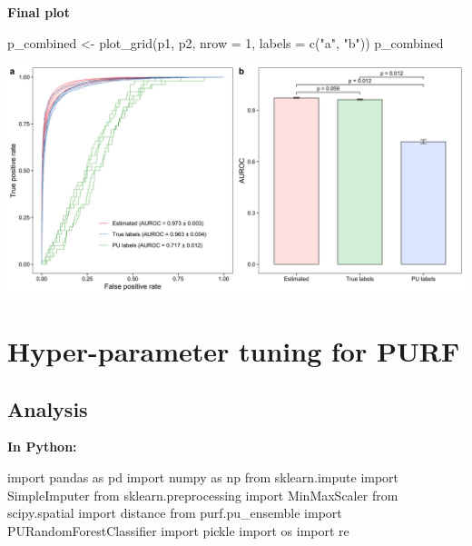 \documentclass[
  11pt,
  oneside]{book}
\newenvironment{Shaded}{\begin{snugshade}}{\end{snugshade}}
\newcommand{\AttributeTok}[1]{\textcolor[rgb]{0.77,0.63,0.00}{#1}}
\newcommand{\DecValTok}[1]{\textcolor[rgb]{0.00,0.00,0.81}{#1}}
\newcommand{\FunctionTok}[1]{\textcolor[rgb]{0.00,0.00,0.00}{#1}}
\newcommand{\ImportTok}[1]{#1}
\newcommand{\NormalTok}[1]{#1}
\newcommand{\OtherTok}[1]{\textcolor[rgb]{0.56,0.35,0.01}{#1}}
\newcommand{\StringTok}[1]{\textcolor[rgb]{0.31,0.60,0.02}{#1}}
\begin{document}
\textbf{Final plot}

\begin{Shaded}
\begin{Highlighting}[]
\NormalTok{p\_combined }\OtherTok{\textless{}{-}} \FunctionTok{plot\_grid}\NormalTok{(p1, p2, }\AttributeTok{nrow =} \DecValTok{1}\NormalTok{, }\AttributeTok{labels =} \FunctionTok{c}\NormalTok{(}\StringTok{"a"}\NormalTok{, }\StringTok{"b"}\NormalTok{))}
\NormalTok{p\_combined}
\end{Highlighting}
\end{Shaded}

\begin{center}\includegraphics[width=1\linewidth]{./figures/Supplementary Fig 2} \end{center}

\hypertarget{hyper-parameter-tuning-for-purf}{%
\section{Hyper-parameter tuning for PURF}\label{hyper-parameter-tuning-for-purf}}

\hypertarget{analysis-1}{%
\subsection{Analysis}\label{analysis-1}}

\textbf{In Python: }

\begin{Shaded}
\begin{Highlighting}[]
\ImportTok{import}\NormalTok{ pandas }\ImportTok{as}\NormalTok{ pd}
\ImportTok{import}\NormalTok{ numpy }\ImportTok{as}\NormalTok{ np}
\ImportTok{from}\NormalTok{ sklearn.impute }\ImportTok{import}\NormalTok{ SimpleImputer}
\ImportTok{from}\NormalTok{ sklearn.preprocessing }\ImportTok{import}\NormalTok{ MinMaxScaler}
\ImportTok{from}\NormalTok{ scipy.spatial }\ImportTok{import}\NormalTok{ distance}
\ImportTok{from}\NormalTok{ purf.pu\_ensemble }\ImportTok{import}\NormalTok{ PURandomForestClassifier}
\ImportTok{import}\NormalTok{ pickle}
\ImportTok{import}\NormalTok{ os}
\ImportTok{import}\NormalTok{ re}
\end{Highlighting}
\end{Shaded}
\end{document}
